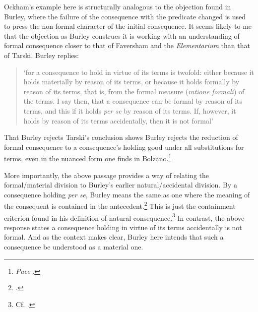 \documentclass[]{birkjour}
\begin{document}
Ockham's example here is structurally analogous to the objection found in Burley, where the failure of the consequence with the predicate changed is used to press the non-formal character of the initial consequence. It seems likely to me that the objection as Burley construes it is working with an understanding of formal consequence closer to that of Faversham and the \textit{Elementarium} than that of Tarski. Burley replies:
\begin{quote}
	`for a consequence to hold in virtue of its terms is twofold: either because it holds materially by reason of its terms, or because it holds formally by reason of its terms, that is, from the formal measure (\textit{ratione formali}) of the terms. I say then, that a consequence can be formal by reason of its terms, and this if it holds \textit{per se} by reason of its terms. If, however, it holds by reason of its terms accidentally, then it is not formal'
\end{quote}
That Burley rejects Tarski's conclusion shows Burley rejects the reduction of formal consequence to a consequence's holding good under all substitutions for terms, even in the nuanced form one finds in Bolzano.\footnote{\textit{Pace} \autocite[pp. 16-17]{HodgesBurley}.} 

More importantly, the above passage provides a way of relating the formal/material division to Burley's earlier natural/accidental division. By a consequence holding \textit{per se}, Burley means the same as one where the meaning of the consequent is contained in the antecedent.\footnote{\autocite[p. 158, par. 160]{Green-Pedersen1980b}.} This is just the containment criterion found in his definition of natural consequence.\footnote{Cf. \autocite[I, d. 11, q. 2]{ScotusRepPar}.} In contrast, the above response states a consequence holding in virtue of its terms accidentally is not formal. And as the context makes clear, Burley here intends that such a consequence be understood as a material one.
\end{document}
